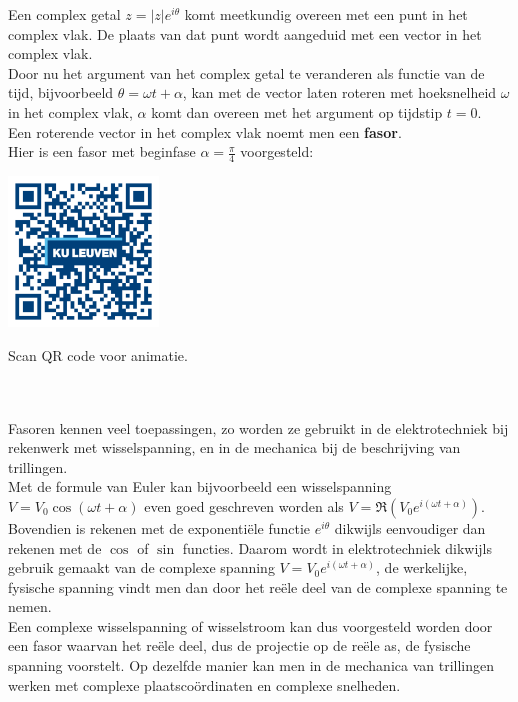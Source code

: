Een complex getal $z=|z|e^{i\theta}$ komt meetkundig overeen met een punt in het complex vlak. De plaats van dat punt wordt aangeduid met een vector in het complex vlak.\\
Door nu het argument van het complex getal te veranderen als functie van de tijd, bijvoorbeeld $\theta= \omega t + \alpha$, kan met de vector laten roteren met hoeksnelheid $\omega$ in het complex vlak, $\alpha$ komt dan overeen met het argument op tijdstip $t=0$.\\
Een roterende vector in het complex vlak noemt men een {\bf fasor}.\\

Hier is een fasor met beginfase $\alpha=\frac{\pi}{4}$ voorgesteld:\\


\begin{minipage}{.25\linewidth}
	\raggedright
	\includegraphics[width=4cm]{3_gonio_complexe_getallen/inputs/QR_Code_ANIMATIE5_module3new}
\end{minipage}
\begin{minipage}{.7\linewidth}
	Scan QR code voor animatie.
\end{minipage}    \\   \\

Fasoren kennen veel toepassingen, zo worden ze gebruikt in de elektrotechniek bij rekenwerk met wisselspanning, en in de mechanica bij de beschrijving van trillingen. \\ 
Met de formule van Euler kan bijvoorbeeld een wisselspanning $V=V_{0}\cos(\omega t + \alpha)$ even goed geschreven worden als $V=\Re (V_{0}e^{i(\omega t + \alpha)}) $. Bovendien is rekenen met de exponenti\"{e}le functie $e^{i\theta}$ dikwijls eenvoudiger dan rekenen met de $\cos$ of $\sin$ functies. Daarom wordt in elektrotechniek dikwijls gebruik gemaakt van de complexe spanning $V=V_{0}e^{i(\omega t + \alpha)}$, de werkelijke, fysische spanning vindt men dan door het re\"{e}le deel van de complexe spanning te nemen.\\
Een complexe wisselspanning of wisselstroom kan dus voorgesteld worden door een fasor waarvan het re\"{e}le deel, dus de projectie op de re\"{e}le as, de fysische spanning voorstelt.  Op dezelfde manier kan men in de mechanica van trillingen werken met complexe plaatsco\"{o}rdinaten en complexe snelheden.\\

